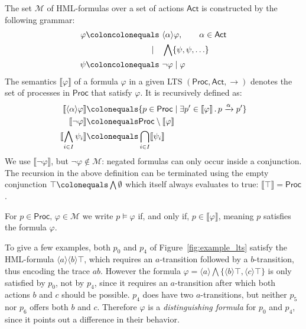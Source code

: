 \begin{definition}%
    \label{def:hml}
    The set $\mathcal{M}$ of HML-formulas over a set of actions $\mathsf{Act}$
    is constructed by the following grammar:
    \begin{align*}
        \varphi \coloncolonequals\ &\langle \alpha \rangle \varphi,
            \qquad \alpha \in \mathsf{Act} \\
            \mid \quad &\bigwedge \{\psi, \psi, \ldots\} \\
        \psi \coloncolonequals\ &\neg \varphi \mid \varphi
    \end{align*}
    The semantics $\llbracket \varphi \rrbracket$ of a formula
    $\varphi$ in a given LTS
    $(\mathsf{Proc}, \mathsf{Act}, {\rightarrow})$ denotes the set of processes in
    $\mathsf{Proc}$ that satisfy $\varphi$.
    It is recursively defined as:
    \begin{align*}
        \llbracket \langle \alpha \rangle \varphi \rrbracket &\colonequals
            \{p \in \mathsf{Proc} \mid
              \exists p' \in \llbracket \varphi \rrbracket\,.\,
              p \xrightarrow{\alpha} p'
            \} \\
        \llbracket \neg \varphi \rrbracket &\colonequals
            \mathsf{Proc} \setminus \llbracket \varphi \rrbracket \\
        \llbracket \bigwedge_{i \in I} \psi_i \rrbracket &\colonequals
            \bigcap_{i \in I} \llbracket \psi_i \rrbracket
    \end{align*}
    We use $\llbracket \neg \varphi \rrbracket$,
    but $\neg \varphi \notin \mathcal{M}$:
    negated formulas can only occur inside a conjunction.
    The recursion in the above definition can be terminated using the empty
    conjunction $\top \colonequals \bigwedge \emptyset$
    which itself always evaluates to true:
    $\llbracket \top \rrbracket = \mathsf{Proc}$.

    For $p \in \mathsf{Proc},\, \varphi \in \mathcal{M}$
    we write $p \models \varphi$ if, and only if,
    $p \in \llbracket \varphi \rrbracket$,
    meaning $p$ satisfies the formula $\varphi$.
\end{definition}

To give a few examples,
both $p_0$ and $p_4$ of Figure~\ref{fig:example_lts} satisfy the HML-formula
$\langle a \rangle \langle b \rangle \top$,
which requires an $a$-transition followed by a $b$-transition,
thus encoding the trace $ab$.
However the formula
$\varphi = \langle a \rangle \bigwedge \{
    \langle b \rangle \top, \langle c \rangle \top \}$
is only satisfied by $p_0$, not by $p_4$,
since it requires an $a$-transition
after which both actions $b$ and $c$ should be possible.
$p_4$ does have two $a$-transitions,
but neither $p_5$ nor $p_6$ offers both $b$ and $c$.
Therefore $\varphi$ is a \emph{distinguishing formula} for $p_0$ and $p_4$,
since it points out a difference in their behavior.


